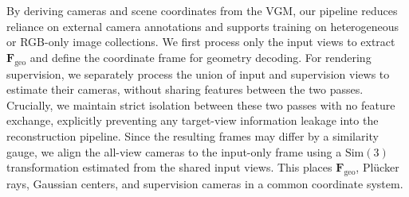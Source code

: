 \documentclass[letterpaper]{article} %
\begin{document}

By deriving cameras and scene coordinates from the VGM, our pipeline reduces reliance on external camera annotations and supports training on heterogeneous or RGB-only image collections. We first process only the input views to extract $\mathbf{F}_{\mathrm{geo}}$ and define the coordinate frame for geometry decoding. For rendering supervision, we separately process the union of input and supervision views to estimate their cameras, without sharing features between the two passes. Crucially, we maintain strict isolation between these two passes with no feature exchange, explicitly preventing any target-view information leakage into the reconstruction pipeline. Since the resulting frames may differ by a similarity gauge, we align the all-view cameras to the input-only frame using a $\mathrm{Sim}(3)$ transformation estimated from the shared input views. This places $\mathbf{F}_{\mathrm{geo}}$, Pl\"ucker rays, Gaussian centers, and supervision cameras in a common coordinate system.
\end{document}
